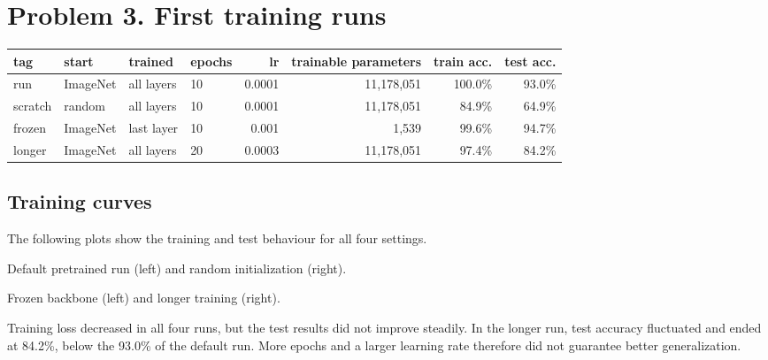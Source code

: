\documentclass[11pt]{article}
\begin{document}
\section*{Problem 3. First training runs}

\begin{center}\footnotesize
\begin{tabular}{llllrrrr}
\toprule
tag & start & trained & epochs & lr & trainable parameters & train acc. & test acc. \\
\midrule
run & ImageNet & all layers & 10 & 0.0001 & 11,178,051 & 100.0\% & 93.0\% \\
scratch & random & all layers & 10 & 0.0001 & 11,178,051 & 84.9\% & 64.9\% \\
frozen & ImageNet & last layer & 10 & 0.001 & 1,539 & 99.6\% & 94.7\% \\
longer & ImageNet & all layers & 20 & 0.0003 & 11,178,051 & 97.4\% & 84.2\% \\
\bottomrule
\end{tabular}
\end{center}

\subsection*{Training curves}
The following plots show the training and test behaviour for all four settings.

\begin{center}
\hfill
{}

\small Default pretrained run (left) and random initialization (right).
\end{center}

\begin{center}
\hfill
{}

\small Frozen backbone (left) and longer training (right).
\end{center}

Training loss decreased in all four runs, but the test results did not improve steadily. In the longer run, test accuracy fluctuated and ended at 84.2\%, below the 93.0\% of the default run. More epochs and a larger learning rate therefore did not guarantee better generalization.
\end{document}
